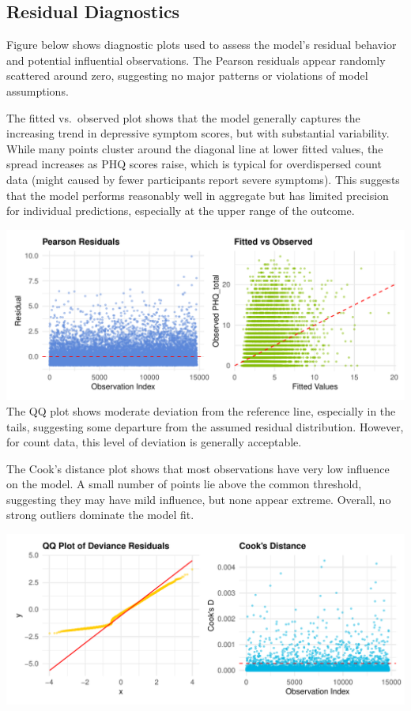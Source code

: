 \documentclass[
  11pt,
]{article}
\begin{document}
\subsection{Residual Diagnostics}\label{residual-diagnostics}

Figure below shows diagnostic plots used to assess the model's residual behavior and potential influential observations. The Pearson residuals appear randomly scattered around zero, suggesting no major patterns or violations of model assumptions.

The fitted vs.~observed plot shows that the model generally captures the increasing trend in depressive symptom scores, but with substantial variability. While many points cluster around the diagonal line at lower fitted values, the spread increases as PHQ scores raise, which is typical for overdispersed count data (might caused by fewer participants report severe symptoms). This suggests that the model performs reasonably well in aggregate but has limited precision for individual predictions, especially at the upper range of the outcome.

\includegraphics{report_files/figure-latex/Residuals1-1.pdf}
The QQ plot shows moderate deviation from the reference line, especially in the tails, suggesting some departure from the assumed residual distribution. However, for count data, this level of deviation is generally acceptable.

The Cook's distance plot shows that most observations have very low influence on the model. A small number of points lie above the common threshold, suggesting they may have mild influence, but none appear extreme. Overall, no strong outliers dominate the model fit.

\includegraphics{report_files/figure-latex/Residuals2-1.pdf}
\end{document}
